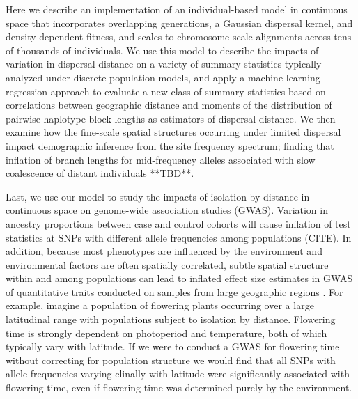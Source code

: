 \documentclass[9pt,twocolumn,twoside]{gsajnl}
\begin{document}
Here we describe an implementation of an individual-based model in continuous space that incorporates overlapping generations, a Gaussian dispersal kernel, and density-dependent fitness, and scales to chromosome-scale alignments across tens of thousands of individuals. We use this model to describe the impacts of variation in dispersal distance on a variety of summary statistics typically analyzed under discrete population models, and apply a machine-learning regression approach to evaluate a new class of summary statistics based on correlations between geographic distance and moments of the distribution of pairwise haplotype block lengths as estimators of dispersal distance. We then examine how the fine-scale spatial structures occurring under limited dispersal impact demographic inference from the site frequency spectrum; finding that inflation of branch lengths for mid-frequency alleles associated with slow coalescence of distant individuals **TBD**. 

Last, we use our model to study the impacts of isolation by distance in continuous space on genome-wide association studies (GWAS). Variation in ancestry proportions between case and control cohorts will cause inflation of test statistics at SNPs with different allele frequencies among populations (CITE). In addition, because most phenotypes are influenced by the environment and environmental factors are often spatially correlated, subtle spatial structure within and among populations can lead to inflated effect size estimates in GWAS of quantitative traits conducted on samples from large geographic regions \citep{Mathieson2012}. For example, imagine a population of flowering plants occurring over a large latitudinal range with populations subject to isolation by distance. Flowering time is strongly dependent on photoperiod and temperature, both of which typically vary with latitude. If we were to conduct a GWAS for flowering time without correcting for population structure we would find that all SNPs with allele frequencies varying clinally with latitude were significantly associated with flowering time, even if flowering time was determined purely by the environment. 
\end{document}
